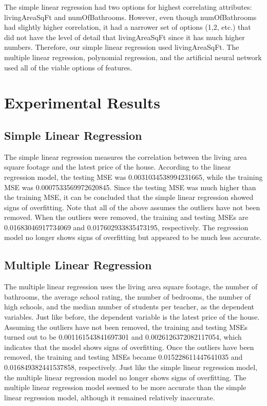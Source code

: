 \documentclass[12pt]{article}
\begin{document}
	The simple linear regression had two options for highest correlating attributes: livingAreaSqFt and numOfBathrooms. However, even though numOfBathrooms had slightly higher correlation, it had a narrower set of options (1,2, etc.) that did not have the level of detail that livingAreaSqFt since it has much higher numbers. Therefore, our simple linear regression used livingAreaSqFt. The multiple linear regression, polynomial regression, and the artificial neural network used all of the viable options of features.
	
	\section{Experimental Results}
	
	\subsection{Simple Linear Regression}
	
	The simple linear regression measures the correlation between the living area square footage and the latest price of the house. According to the linear regression model, the testing MSE was 0.0031034538994231665, while the training MSE was 0.0007533569972620845. Since the testing MSE was much higher than the training MSE, it can be concluded that the simple linear regression showed signs of overfitting. Note that all of the above assumes the outliers have not been removed. When the outliers were removed, the training and testing MSEs are 0.01683046917734069 and 0.017602933835473195, respectively. The regression model no longer shows signs of overfitting but appeared to be much less accurate.
	
	
	\subsection{Multiple Linear Regression}
	
	The multiple linear regression uses the living area square footage, the number of bathrooms, the average school rating, the number of bedrooms, the number of high schools, and the median number of students per teacher, as the dependent variables. Just like before, the dependent variable is the latest price of the house. Assuming the outliers have not been removed, the training and testing MSEs turned out to be 0.001161543841697301 and 0.0026126372082117054, which indicates that the model shows signs of overfitting. Once the outliers have been removed, the training and testing MSEs became 0.015228611447641035 and 0.016849382441537858, respectively. Just like the simple linear regression model, the multiple linear regression model no longer shows signs of overfitting. The multiple linear regression model seemed to be more accurate than the simple linear regression model, although it remained relatively inaccurate.
	
\end{document}
